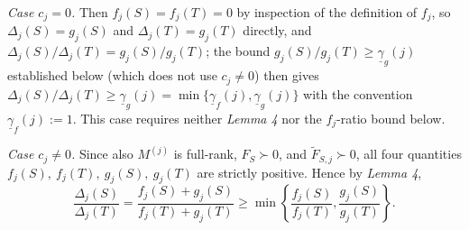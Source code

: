 \documentclass[letterpaper, 10 pt, conference]{ieeeconf}  %
\begin{document}
\noindent \textit{Case $c_j=0$.} Then $f_j(S)=f_j(T)=0$ by inspection of the definition of $f_j$, so $\Delta_j(S)=g_j(S)$ and $\Delta_j(T)=g_j(T)$ directly, and $\Delta_j(S)/\Delta_j(T)=g_j(S)/g_j(T)$; the bound $g_j(S)/g_j(T)\ge \underline\gamma_g(j)$ established below (which does not use $c_j\neq 0$) then gives $\Delta_j(S)/\Delta_j(T)\ge \underline\gamma_g(j)=\min\{\underline\gamma_f(j),\underline\gamma_g(j)\}$ with the convention $\underline\gamma_f(j):=1$. This case requires neither \textit{Lemma 4} nor the $f_j$-ratio bound below.

\noindent \textit{Case $c_j\neq 0$.} Since also $M^{(j)}$ is full-rank, \(F_S\succ 0\), and \(\widetilde F_{S,j}\succ 0\), all four quantities \(f_j(S), \ f_j(T), \ g_j(S), \ g_j(T)\) are strictly positive. Hence by \textit{Lemma 4},
\begin{equation}
\label{eq:min_split}
\frac{\Delta_j(S)}{\Delta_j(T)}
=
\frac{f_j(S)+g_j(S)}{f_j(T)+g_j(T)}
\ge
\min\left\{
\frac{f_j(S)}{f_j(T)},
\frac{g_j(S)}{g_j(T)}
\right\}.
\end{equation}
\end{document}
